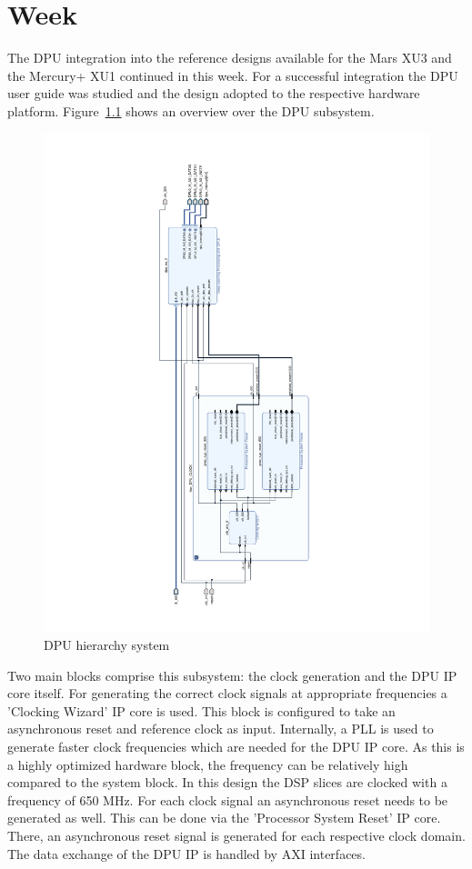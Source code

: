 \chapter{Week}
The \ac{DPU} integration into the reference designs available for the Mars XU3 and the Mercury+ XU1 continued in this week. For a successful integration the \ac{DPU} user guide was studied and the design adopted to the respective hardware platform. Figure~\ref{fig:dpu_hier} shows an overview over the \ac{DPU} subsystem.
\begin{figure}[!htb]
	\centering
		\includegraphics[width=\textwidth]{bilder/dpu_hier.pdf}
		\caption{\acs{DPU} hierarchy system}
		\label{fig:dpu_hier}
\end{figure}
Two main blocks comprise this subsystem: the clock generation and the \ac{DPU} \ac{IP} core itself. For generating the correct clock signals at appropriate frequencies a 'Clocking Wizard' \ac{IP} core is used. This block is configured to take an asynchronous reset and reference clock as input. Internally, a \ac{PLL} is used to generate faster clock frequencies which are needed for the \ac{DPU} \ac{IP} core. As this is a highly optimized hardware block, the frequency can be relatively high compared to the system block. In this design the \ac{DSP} slices are clocked with a frequency of 650 MHz. For each clock signal an asynchronous reset needs to be generated as well. This can be done via the 'Processor System Reset' \ac{IP} core. There, an asynchronous reset signal is generated for each respective clock domain. The data exchange of the \ac{DPU} \ac{IP} is handled by \ac{AXI} interfaces.
